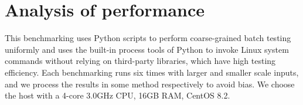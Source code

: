 \section{Analysis of performance}




This benchmarking uses Python scripts to perform coarse-grained batch testing
uniformly and uses the built-in process tools of Python to invoke Linux system
commands without relying on third-party libraries, which have high testing efficiency.
Each benchmarking runs six times with larger and smaller scale inputs,
and we process the results in some method respectively to avoid bias.
We choose the host with a 4-core 3.0GHz CPU, 16GB RAM, CentOS 8.2.

